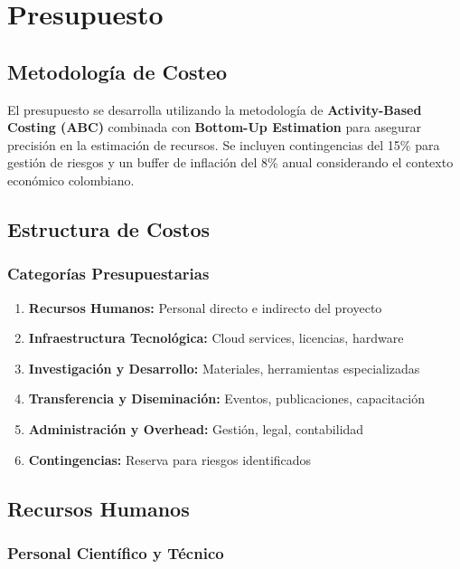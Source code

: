\section{Presupuesto}

\subsection{Metodología de Costeo}

El presupuesto se desarrolla utilizando la metodología de \textbf{Activity-Based Costing (ABC)} combinada con \textbf{Bottom-Up Estimation} para asegurar precisión en la estimación de recursos. Se incluyen contingencias del 15\% para gestión de riesgos y un buffer de inflación del 8\% anual considerando el contexto económico colombiano.

\subsection{Estructura de Costos}

\subsubsection{Categorías Presupuestarias}
\begin{enumerate}
    \item \textbf{Recursos Humanos:} Personal directo e indirecto del proyecto
    \item \textbf{Infraestructura Tecnológica:} Cloud services, licencias, hardware
    \item \textbf{Investigación y Desarrollo:} Materiales, herramientas especializadas
    \item \textbf{Transferencia y Diseminación:} Eventos, publicaciones, capacitación
    \item \textbf{Administración y Overhead:} Gestión, legal, contabilidad
    \item \textbf{Contingencias:} Reserva para riesgos identificados
\end{enumerate}

\subsection{Recursos Humanos}

\subsubsection{Personal Científico y Técnico}

